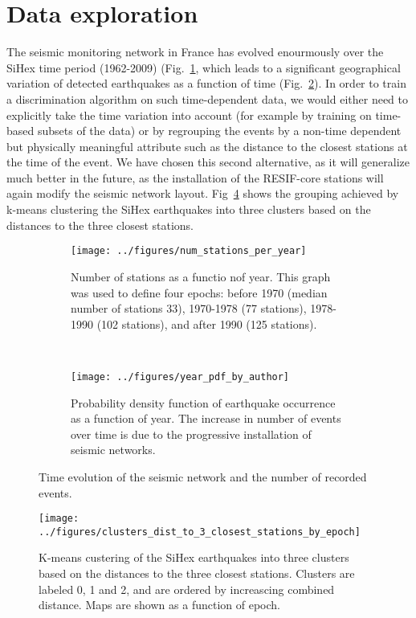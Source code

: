 \section{Data exploration}
The seismic monitoring network in France has evolved enourmously over the SiHex
time period (1962-2009) (Fig.~\ref{fg:stations_by_year}, which leads to a
significant geographical variation of detected earthquakes as a function of
time (Fig.~\ref{fg:events_by_year}). In order to train a discrimination
algorithm on such time-dependent data, we would either need to explicitly take
the time variation into account (for example by training on time-based subsets
of the data) or by regrouping the events by a non-time dependent but physically
meaningful attribute such as the distance to the closest stations at the
time of the event. We have chosen this second alternative, as it will
generalize much better in the future, as the installation of the RESIF-core
stations will again modify the seismic network layout.
Fig~\ref{fg:station_clusters} shows the grouping achieved by k-means clustering
the SiHex earthquakes into three clusters based on the distances to the three
closest stations.

\begin{figure}
\centering
\begin{subfigure}[t]{0.95\textwidth}
	\centering
	\texttt{[image: ../figures/num\_stations\_per\_year]}
	\caption{Number of stations as a functio nof year. This graph was used
	to define four epochs: before 1970 (median number of stations 33),
	1970-1978 (77 stations), 1978-1990 (102 stations), and after 1990 (125
	stations).} 
	\label{fg:stations_by_year}
\end{subfigure}
~
\begin{subfigure}[t]{0.95\textwidth}
	\centering
	\texttt{[image: ../figures/year\_pdf\_by\_author]}
	\caption{Probability density function of earthquake occurrence as a
	function of year. The increase in number of events over time is due to
	the progressive installation of seismic networks.}
	\label{fg:events_by_year}
\end{subfigure}
\caption{Time evolution of the seismic network and the number of recorded
events.}
\label{fg:network_evolution}
\end{figure}

\begin{figure}
\centering
\texttt{[image: ../figures/clusters\_dist\_to\_3\_closest\_stations\_by\_epoch]}
\caption{K-means custering of the SiHex earthquakes into three clusters based
on the distances to the three closest stations. Clusters are labeled 0, 1 and
2, and are ordered by increascing combined distance. Maps are shown as a
function of epoch.}
\label{fg:station_clusters}
\end{figure}

